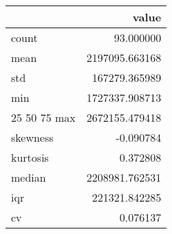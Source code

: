 \begin{tabular}{lr}
\toprule
 & value \\
\midrule
count & 93.000000 \\
mean & 2197095.663168 \\
std & 167279.365989 \\
min & 1727337.908713 \\
25%
50%
75%
max & 2672155.479418 \\
skewness & -0.090784 \\
kurtosis & 0.372808 \\
median & 2208981.762531 \\
iqr & 221321.842285 \\
cv & 0.076137 \\
\bottomrule
\end{tabular}
